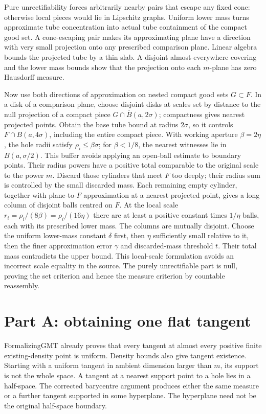 Pure unrectifiability forces arbitrarily nearby pairs that escape any fixed
cone: otherwise local pieces would lie in Lipschitz graphs. Uniform lower
mass turns approximate tube concentration into actual tube containment of
the compact good set. A cone-escaping pair makes its approximating plane
have a direction with very small projection onto any prescribed comparison
plane. Linear algebra bounds the projected tube by a thin slab. A disjoint
almost-everywhere covering and the lower mass bounds show that the projection
onto each $m$-plane has zero Hausdorff measure.

Now use both directions of approximation on nested compact good sets
$G\subset F$. In a disk of a comparison plane, choose disjoint disks at scales
set by distance to the null projection of a compact piece
$G\cap\overline B(a,2\sigma)$; compactness gives nearest projected points.
Obtain the base tube bound at radius $2\sigma$, so it controls
$F\cap B(a,4\sigma)$, including the entire compact piece. With working
aperture $\beta=2\eta$, the hole radii satisfy $\rho_i\leq\beta\sigma$;
for $\beta<1/8$, the nearest witnesses lie in $B(a,\sigma/2)$.
This buffer avoids applying an open-ball estimate to boundary points.
Their radius powers have a
positive total comparable to the original scale to the power $m$. Discard
those cylinders that meet $F$ too deeply; their radius sum is controlled by
the small discarded mass. Each remaining empty cylinder, together with
plane-to-$F$ approximation at a nearest projected point, gives a long column
of disjoint balls centred on $F$. At the local scale
$r_i=\rho_i/(8\beta)=\rho_i/(16\eta)$ there are at least a positive constant times $1/\eta$
balls, each with its prescribed lower mass. The columns are mutually disjoint.
Choose the uniform lower-mass constant $\delta$ first, then
$\eta$ sufficiently small relative to it, then the finer approximation error
$\gamma$ and discarded-mass threshold $t$. Their total mass contradicts
the upper bound.
This local-scale formulation avoids an incorrect scale equality in the source.
The purely unrectifiable part is null, proving the set criterion and hence
the measure criterion by countable reassembly.

\section{Part A: obtaining one flat tangent}
FormalizingGMT already proves that every tangent at almost every positive
finite existing-density point is uniform. Density bounds also give tangent
existence. Starting with a uniform tangent in ambient dimension larger than
$m$, its support is not the whole space. A tangent at a nearest support point
to a hole lies in a half-space. The corrected barycentre argument produces
either the same measure or a further tangent supported in some hyperplane.
The hyperplane need not be the original half-space boundary.

